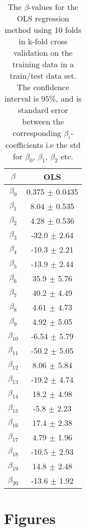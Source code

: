 \documentclass[uio,jmp,amsmath,amssymb,reprint,nofootinbib]{revtex4-1}
\numberwithin{equation}{section}
\begin{document}
\begin{table}[H]
\begin{tabular}{|c|c|}\hline
\(\beta\) & OLS \\ \hline
\(\beta_{0}\) & 0.375 \(\pm\) 0.0435 \\ \hline
\(\beta_{1}\) & 8.04 \(\pm\) 0.535 \\ \hline
\(\beta_{2}\) & 4.28 \(\pm\) 0.536 \\ \hline
\(\beta_{3}\) & -32.0 \(\pm\) 2.64 \\ \hline
\(\beta_{4}\) & -10.3 \(\pm\) 2.21 \\ \hline
\(\beta_{5}\) & -13.9 \(\pm\) 2.44 \\ \hline
\(\beta_{6}\) & 35.9 \(\pm\) 5.76 \\ \hline
\(\beta_{7}\) & 40.2 \(\pm\) 4.49 \\ \hline
\(\beta_{8}\) & 4.61 \(\pm\) 4.73 \\ \hline
\(\beta_{9}\) & 4.92 \(\pm\) 5.05 \\ \hline
\(\beta_{10}\) & -6.54 \(\pm\) 5.79 \\ \hline
\(\beta_{11}\) & -50.2 \(\pm\) 5.05 \\ \hline
\(\beta_{12}\) & 8.06 \(\pm\) 5.84 \\ \hline
\(\beta_{13}\) & -19.2 \(\pm\) 4.74 \\ \hline
\(\beta_{14}\) & 18.2 \(\pm\) 4.98 \\ \hline
\(\beta_{15}\) & -5.8 \(\pm\) 2.23 \\ \hline
\(\beta_{16}\) & 17.4 \(\pm\) 2.38 \\ \hline
\(\beta_{17}\) & 4.79 \(\pm\) 1.96 \\ \hline
\(\beta_{18}\) & -10.5 \(\pm\) 2.93 \\ \hline
\(\beta_{19}\) & 14.8 \(\pm\) 2.48 \\ \hline
\(\beta_{20}\) & -13.6 \(\pm\) 1.92 \\ \hline
\end{tabular}
\caption{The \(\beta\)-values for the OLS regression method using 10 folds in k-fold cross validation on the training data in a train/test data set. The confidence interval is 95\%, and is standard error between the corresponding \(\beta_i\)-coefficients i.e the std for \(\beta_0\), \(\beta_1\), \(\beta_2\) etc.}
\label{tab:14}
\end{table}

\section{Figures}
\end{document}
